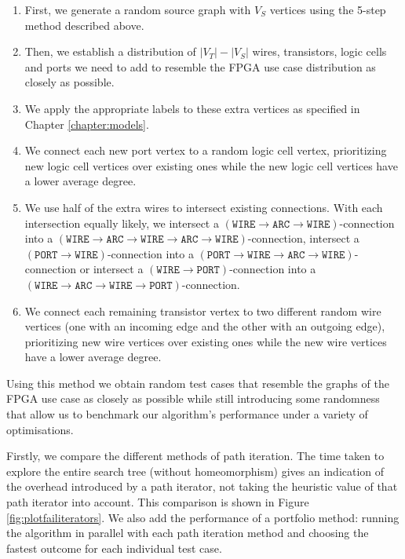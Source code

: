 \begin{enumerate}
\item First, we generate a random source graph with $V_S$ vertices using the 5-step method described above.
\item Then, we establish a distribution of $|V_T|-|V_S|$ wires, transistors, logic cells and ports we need to add to resemble the FPGA use case distribution as closely as possible.
\item We apply the appropriate labels to these extra vertices as specified in Chapter \ref{chapter:models}.
\item We connect each new port vertex to a random logic cell vertex, prioritizing new logic cell vertices over existing ones while the new logic cell vertices have a lower average degree.
\item We use half of the extra wires to intersect existing connections. With each intersection equally likely, we intersect a $(\mathtt{WIRE} \to \mathtt{ARC} \to \mathtt{WIRE})$-connection into a $(\mathtt{WIRE} \to \mathtt{ARC} \to \mathtt{WIRE} \to \mathtt{ARC} \to \mathtt{WIRE})$-connection, intersect a $(\mathtt{PORT} \to \mathtt{WIRE})$-connection into a $(\mathtt{PORT} \to \mathtt{WIRE} \to \mathtt{ARC} \to \mathtt{WIRE})$-connection or intersect a  $(\mathtt{WIRE} \to \mathtt{PORT})$-connection into a $(\mathtt{WIRE} \to \mathtt{ARC} \to \mathtt{WIRE} \to \mathtt{PORT})$-connection.
\item We connect each remaining transistor vertex to two different random wire vertices (one with an incoming edge and the other with an outgoing edge), prioritizing new wire vertices over existing ones while the new wire vertices have a lower average degree.
\end{enumerate}




Using this method we obtain random test cases that resemble the graphs of the FPGA use case as closely as possible while still introducing some randomness that allow us to benchmark our algorithm's performance under a variety of optimisations.

Firstly, we compare the different methods of path iteration. The time taken to explore the entire search tree (without homeomorphism) gives an indication of the overhead introduced by a path iterator, not taking the heuristic value of that path iterator into account. This comparison is shown in Figure \ref{fig:plotfailiterators}. We also add the performance of a portfolio method: running the algorithm in parallel with each path iteration method and choosing the fastest outcome for each individual test case.

